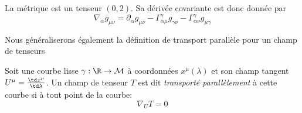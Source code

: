 \begin{exmp}
    La métrique est un tenseur $(0,2)$. Sa dérivée covariante est donc donnée par
    \begin{equation}
        \boxed{\nabla_{\alpha} g_{\mu \nu} = \partial_{\alpha}g_{\mu \nu} - \Gamma^{\gamma}_{\alpha \mu}g_{\gamma \nu}-\Gamma^{\gamma}_{\alpha \nu}g_{\mu \gamma}}
    \end{equation}
\end{exmp}
Nous généraliserons également la définition de transport parallèle pour un champ de tenseurs
\begin{theoremframe}
    \begin{defi}
    
        Soit une courbe lisse $\gamma:\R \to \mathcal{M}$ à coordonnées $x^{\mu}(\lambda)$ et son champ tangent $U^{\mu} = \frac{\td x^{\mu}}{\td\lambda}$. Un champ de tenseur $T$ est dit \emph{transporté parallèlement} à cette courbe si à tout point de la courbe:
        \begin{equation}
            \nabla_U T = 0
        \end{equation}
    \end{defi}
\end{theoremframe}
